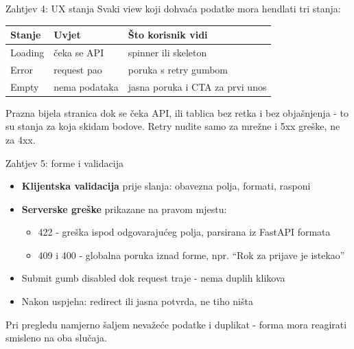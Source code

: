 \begin{frame}{Zahtjev 4: UX stanja}
Svaki view koji dohvaća podatke mora hendlati tri stanja:

\vspace{0.4em}
\begin{tabular}{@{}llp{5.5cm}@{}}
  \toprule
  \textbf{Stanje} & \textbf{Uvjet} & \textbf{Što korisnik vidi} \\
  \midrule
  Loading & čeka se API & spinner ili skeleton \\
  Error & request pao & poruka s retry gumbom \\
  Empty & nema podataka & jasna poruka i CTA za prvi unos \\
  \bottomrule
\end{tabular}

\vspace{0.6em}
Prazna bijela stranica dok se čeka API, ili tablica bez retka i bez objašnjenja - to su stanja za koja skidam bodove. Retry nudite samo za mrežne i 5xx greške, ne za 4xx.
\end{frame}

\begin{frame}{Zahtjev 5: forme i validacija}
\begin{itemize}
  \item \textbf{Klijentska validacija} prije slanja: obavezna polja, formati, rasponi
  \item \textbf{Serverske greške} prikazane na pravom mjestu:
  \begin{itemize}
    \item 422 - greška ispod odgovarajućeg polja, parsirana iz FastAPI  formata
    \item 409 i 400 - globalna poruka iznad forme, npr. \enquote{Rok za prijave je istekao}
  \end{itemize}
  \item Submit gumb disabled dok request traje - nema duplih klikova
  \item Nakon uspjeha: redirect ili jasna potvrda, ne tiho ništa
\end{itemize}

\vspace{0.4em}
Pri pregledu namjerno šaljem nevažeće podatke i duplikat - forma mora reagirati smisleno na oba slučaja.
\end{frame}

